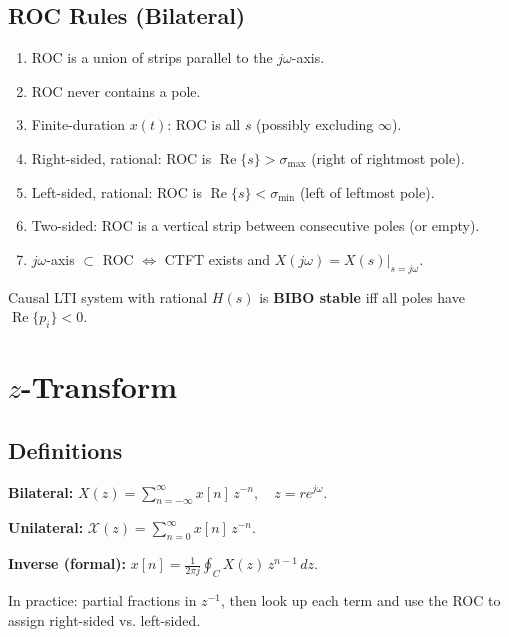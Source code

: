 \documentclass[10pt]{article}
\newcommand{\Real}{\operatorname{Re}}
\begin{document}
\subsection{ROC Rules (Bilateral)}
\begin{enumerate}\setlength\itemsep{-2pt}
\item ROC is a union of strips parallel to the $j\omega$-axis.
\item ROC never contains a pole.
\item Finite-duration $x(t)$: ROC is all $s$ (possibly excluding $\infty$).
\item Right-sided, rational: ROC is $\Real\{s\} > \sigma_{\max}$ (right of rightmost pole).
\item Left-sided, rational: ROC is $\Real\{s\} < \sigma_{\min}$ (left of leftmost pole).
\item Two-sided: ROC is a vertical strip between consecutive poles (or empty).
\item $j\omega$-axis $\subset$ ROC $\iff$ CTFT exists and $X(j\omega) = X(s)|_{s=j\omega}$.
\end{enumerate}
Causal LTI system with rational $H(s)$ is \textbf{BIBO stable} iff all poles have $\Real\{p_i\} < 0$.

\section{$z$-Transform}

\subsection{Definitions}
\textbf{Bilateral:} $\displaystyle X(z) = \sum_{n=-\infty}^{\infty} x[n]\,z^{-n},\quad z = re^{j\omega}.$

\textbf{Unilateral:} $\displaystyle \mathcal{X}(z) = \sum_{n=0}^{\infty} x[n]\,z^{-n}.$

\textbf{Inverse (formal):} $\displaystyle x[n] = \frac{1}{2\pi j}\oint_C X(z)\,z^{n-1}\,dz.$

In practice: partial fractions in $z^{-1}$, then look up each term and use the ROC to assign right-sided vs. left-sided.
\end{document}
